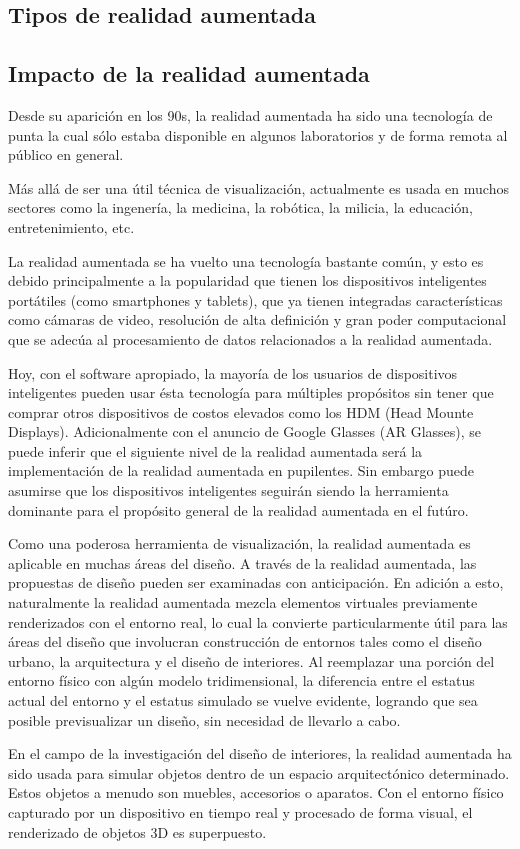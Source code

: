 \subsection{Tipos de realidad aumentada}

\subsection{Impacto de la realidad aumentada}
Desde su aparición en los 90s, la realidad aumentada ha sido una tecnología de punta la cual sólo estaba disponible en algunos laboratorios y de forma remota al público en general. \par
Más allá de ser una útil técnica de visualización, actualmente es usada en muchos sectores como la ingenería, la medicina, la robótica, la milicia, la educación, entretenimiento, etc.\par
La realidad aumentada se ha vuelto una tecnología bastante común, y esto es debido principalmente a la popularidad que tienen los dispositivos inteligentes portátiles (como smartphones y tablets), que ya tienen integradas características como cámaras de video, resolución de alta definición y gran poder computacional que se adecúa al procesamiento de datos relacionados a la realidad aumentada.\par
Hoy, con el software apropiado, la mayoría de los usuarios de dispositivos inteligentes pueden usar ésta tecnología para múltiples propósitos sin tener que comprar otros dispositivos de costos elevados como los HDM (Head Mounte Displays). Adicionalmente con el anuncio de Google Glasses (AR Glasses), se puede inferir que el siguiente nivel de la realidad aumentada será la implementación de la realidad aumentada en pupilentes. Sin embargo puede asumirse que los dispositivos inteligentes seguirán siendo la herramienta dominante para el propósito general de la realidad aumentada en el futúro.\par
Como una poderosa herramienta de visualización, la realidad aumentada es aplicable en muchas áreas del diseño. A través de la realidad aumentada, las propuestas de diseño pueden ser examinadas con anticipación. En adición a esto, naturalmente la realidad aumentada mezcla elementos virtuales previamente renderizados con el entorno real, lo cual la convierte particularmente útil para las áreas del diseño que involucran construcción de entornos tales como el diseño urbano, la arquitectura y el diseño de interiores. Al reemplazar una porción del entorno físico con algún modelo tridimensional, la diferencia entre el estatus actual del entorno y el estatus simulado se vuelve evidente, logrando que sea posible previsualizar un diseño, sin necesidad de llevarlo a cabo.\par
En el campo de la investigación del diseño de interiores, la realidad aumentada ha sido usada para simular objetos dentro de un espacio arquitectónico determinado. Estos objetos a menudo son muebles, accesorios o aparatos. Con el entorno físico capturado por un dispositivo en tiempo real y procesado de forma visual, el renderizado de objetos 3D es superpuesto.\cite{B15}

